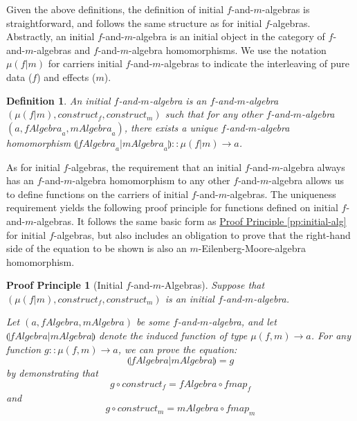 \documentclass{jfp1}
\newcommand{\eFold}[2]{\llparenthesis #1|#2 \rrparenthesis}
\newtheorem{definition}{Definition}
\newtheorem{proofprinciple}{Proof Principle}
\newcommand{\proofprinref}[1]{\hyperref[#1]{Proof Principle \ref*{#1}}}
\begin{document}
Given the above definitions, the definition of initial
$f$-and-$m$-algebras is straightforward, and follows the same
structure as for initial $f$-algebras. Abstractly, an initial
$f$-and-$m$-algebra is an initial object in the category of
$f$-and-$m$-algebras and $f$-and-$m$-algebra homomorphisms. We use the
notation $\mu(f|m)$ for carriers initial $f$-and-$m$-algebras to
indicate the interleaving of pure data ($f$) and effects ($m$).

\begin{definition}
  An \emph{initial} $f$-and-$m$-algebra is an $f$-and-$m$-algebra
  $(\mu(f|m), \mathit{construct}_f, \mathit{construct}_m)$ such that
  for any other $f$-and-$m$-algebra $(a, \mathit{fAlgebra}_a,
  \mathit{mAlgebra}_a)$, there exists a \emph{unique}
  $f$-and-$m$-algebra homomorphism
  $\eFold{\mathit{fAlgebra}_a}{\mathit{mAlgebra}_a} :: \mu(f|m) \to
  a$.
\end{definition}

As for initial $f$-algebras, the requirement that an initial
$f$-and-$m$-algebra always has an $f$-and-$m$-algebra homomorphism to
any other $f$-and-$m$-algebra allows us to define functions on the
carriers of initial $f$-and-$m$-algebras. The uniqueness requirement
yields the following proof principle for functions defined on initial
$f$-and-$m$-algebras. It follows the same basic form as
\proofprinref{pp:initial-alg} for initial $f$-algebras, but also
includes an obligation to prove that the right-hand side of the
equation to be shown is also an $m$-Eilenberg-Moore-algebra
homomorphism.

\begin{proofprinciple}[Initial $f$-and-$m$-Algebras]
  \label{pp:initial-f-m-alg}
  Suppose that $(\mu(f|m), \mathit{construct}_f,
  \mathit{construct}_m)$ is an initial $f$-and-$m$-algebra.

  Let $(a, \mathit{fAlgebra}, \mathit{mAlgebra})$ be some
  $f$-and-$m$-algebra, and let
  $\eFold{\mathit{fAlgebra}}{\mathit{mAlgebra}}$ denote the induced
  function of type $\mu(f,m) \to a$. For any function $g :: \mu(f,m)
  \to a$, we can prove the equation:
  \begin{displaymath}
    \eFold{\mathit{fAlgebra}}{\mathit{mAlgebra}} = g
  \end{displaymath}
  by demonstrating that
  \begin{displaymath}
    g \circ \mathit{construct}_f = \mathit{fAlgebra} \circ \mathit{fmap}_f
  \end{displaymath}
  and
  \begin{displaymath}
    g \circ \mathit{construct}_m = \mathit{mAlgebra} \circ \mathit{fmap}_m
  \end{displaymath}
\end{proofprinciple}
\end{document}
